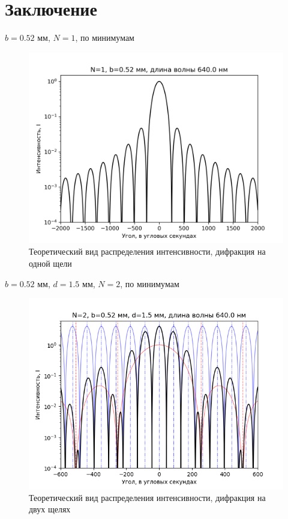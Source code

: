 \section{Заключение}
\begin{table}[H]
	    \caption{$b=0.52$ мм, $N=1$, по минимумам}
	    \label{tab:chem1}

	\mytable
	
\end{table}
\begin{figure}[H]
	\centering
	\includegraphics[]{plot/N1.png}
	\caption{Теоретический вид распределения интенсивности, дифракция на одной щели}
	\label{fig:figure1}
\end{figure}
\begin{table}[H]
	    \caption{$b=0.52$ мм, $d=1.5$ мм, $N=2$, по минимумам}
	    \label{tab:chem1}

	\mytable
	
\end{table}
\begin{figure}[H]
	\centering
	\includegraphics[]{plot/N2.png}
	\caption{Теоретический вид распределения интенсивности, дифракция на двух щелях}
	\label{fig:figure1}
\end{figure}
